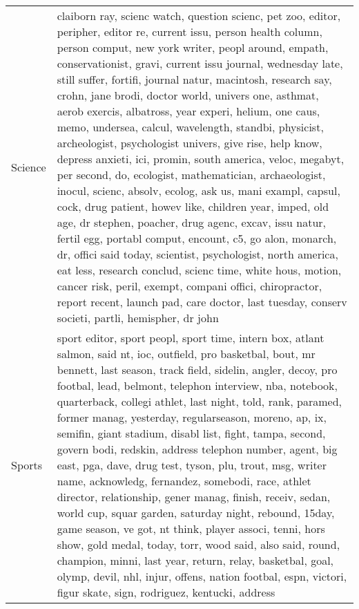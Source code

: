 \begin{longtable}{p{}p{}}
  Science & claiborn ray, scienc watch, question scienc, pet zoo, editor, peripher, editor re, current issu, person health column, person comput, new york writer, peopl around, empath, conservationist, gravi, current issu journal, wednesday late, still suffer, fortifi, journal natur, macintosh, research say, crohn, jane brodi, doctor world, univers one, asthmat, aerob exercis, albatross, year experi, helium, one caus, memo, undersea, calcul, wavelength, standbi, physicist, archeologist, psychologist univers, give rise, help know, depress anxieti, ici, promin, south america, veloc, megabyt, per second, do, ecologist, mathematician, archaeologist, inocul, scienc, absolv, ecolog, ask us, mani exampl, capsul, cock, drug patient, howev like, children year, imped, old age, dr stephen, poacher, drug agenc, excav, issu natur, fertil egg, portabl comput, encount, c5, go alon, monarch, dr, offici said today, scientist, psychologist, north america, eat less, research conclud, scienc time, white hous, motion, cancer risk, peril, exempt, compani offici, chiropractor, report recent, launch pad, care doctor, last tuesday, conserv societi, partli, hemispher, dr john \\ 
  Sports & sport editor, sport peopl, sport time, intern box, atlant salmon, said nt, ioc, outfield, pro basketbal, bout, mr bennett, last season, track field, sidelin, angler, decoy, pro footbal, lead, belmont, telephon interview, nba, notebook, quarterback, collegi athlet, last night, told, rank, paramed, former manag, yesterday, regularseason, moreno, ap, ix, semifin, giant stadium, disabl list, fight, tampa, second, govern bodi, redskin, address telephon number, agent, big east, pga, dave, drug test, tyson, plu, trout, msg, writer name, acknowledg, fernandez, somebodi, race, athlet director, relationship, gener manag, finish, receiv, sedan, world cup, squar garden, saturday night, rebound, 15day, game season, ve got, nt think, player associ, tenni, hors show, gold medal, today, torr, wood said, also said, round, champion, minni, last year, return, relay, basketbal, goal, olymp, devil, nhl, injur, offens, nation footbal, espn, victori, figur skate, sign, rodriguez, kentucki, address \\ 

\end{longtable}
